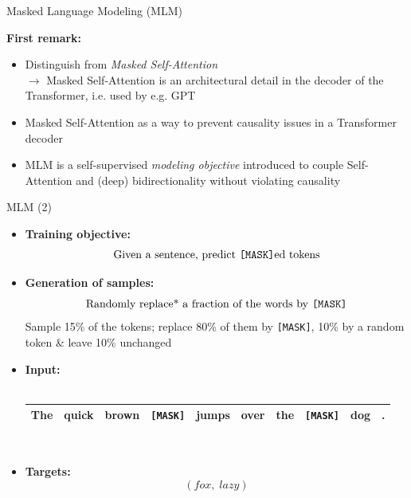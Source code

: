 \documentclass[11pt,compress,t,notes=noshow, xcolor=table]{beamer}
\begin{document}


\begin{frame}{Masked Language Modeling (MLM)}

\vfill

\textbf{First remark:}

\begin{itemize}
	\item Distinguish from \textit{Masked Self-Attention}\\ 
				$\to$ Masked Self-Attention is an architectural detail in the decoder of the Transformer, i.e. used by e.g. GPT
	\item Masked Self-Attention as a way to prevent causality issues in a Transformer decoder 
	\item MLM is a self-supervised \textit{modeling objective} introduced to couple Self-Attention and (deep) bidirectionality without violating causality
\end{itemize}

\vfill

\end{frame}


\begin{frame}{MLM (2)}

\begin{itemize}
\item \textbf{Training objective:} $$\text{Given a sentence, predict \texttt{[MASK]}ed tokens}$$
\item \textbf{Generation of samples:} $$\text{Randomly replace* a fraction of the words by \texttt{[MASK]}}$$
  \scriptsize *Sample 15\% of the tokens; replace 80\% of them by \texttt{[MASK]}, 10\% by a random token \& leave 10\% unchanged
\item \normalsize \textbf{Input:}\\\mbox{}\\
			\footnotesize
\begin{tabular}{|cccccccccc|}
\hline
The & quick & brown & \cellcolor{blue!65}\texttt{[MASK]} & jumps & over & the & \cellcolor{blue!65}\texttt{[MASK]} & dog & . \\
\hline
\end{tabular}\\\mbox{}
\item \normalsize \textbf{Targets:} $$(fox,\; lazy)$$
\end{itemize}

\end{frame}
\end{document}
